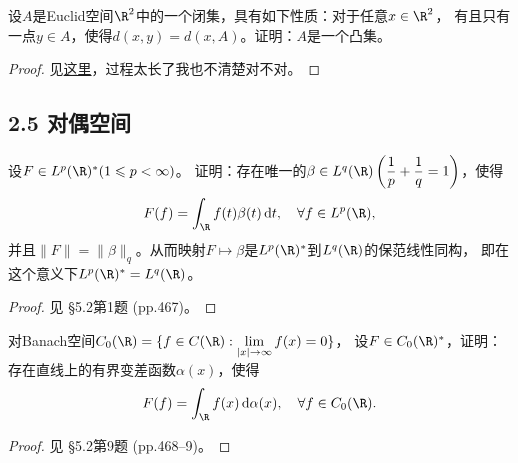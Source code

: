 \begin{14}
    设$A$是Euclid空间$\R^2$中的一个闭集，具有如下性质：对于任意$x\in\R^2$，
    有且只有一点$y \in A$，使得$d(x,y)=d(x,A)$。证明：$A$是一个凸集。
\end{14}
\begin{proof}
    见\href{http://math.stackexchange.com/questions/1130393/chebyshev-sets-in-finite-dimension-are-closed-and-convex?r=SearchResults}{这里}，过程太长了我也不清楚对不对。
\end{proof}

\subsection{2.5 对偶空间}
\begin{1}
    设$F \in L^p(\R)^*(1 \leqslant p < \infty)$。
    证明：存在唯一的$\beta \in L^q(\R)\left(\dfrac{1}{p}+\dfrac{1}{q}=1\right)$，使得
    \[F(f)=\int_\R f(t)\beta(t)\,\mathrm{d}t,\quad\forall f \in L^p(\R),\]
    并且$\|F\|=\|\beta\|_q$。从而映射$F\mapsto\beta$是$L^p(\R)^*$到$L^q(\R)$的保范线性同构，
    即在这个意义下$L^p(\R)^*=L^q(\R)$。
\end{1}
\begin{proof}
    见\cite{Xia} \S5.2第1题 (pp.467)。
\end{proof}

\begin{4}
    对Banach空间$C_0(\R)=\{f \in C(\R):\lim\limits_{|x|\to\infty}f(x)=0\}$，
    设$F \in C_0(\R)^*$，证明：存在直线上的有界变差函数$\alpha(x)$，使得
    \[F(f)=\int_{\R}f(x)\,{\rm d}\alpha(x),\quad\forall f \in C_0(\R).\]
\end{4}
\begin{proof}
    见\cite{Xia} \S5.2第9题 (pp.468--9)。
\end{proof}

